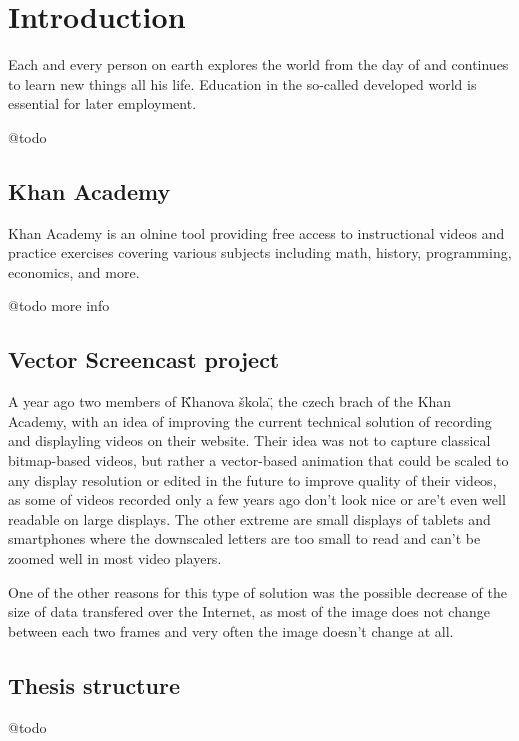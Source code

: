 \chapter*{Introduction}
Each and every person on earth explores the world from the day of and continues to learn new things all his life. Education in the so-called developed world is essential for later employment.

@todo 

\section{Khan Academy}
Khan Academy is an olnine tool providing free access to instructional videos and practice exercises covering various subjects including math, history, programming, economics, and more.

@todo more info

\section{Vector Screencast project}
A year ago two members of \"Khanova škola\", the czech brach of the Khan Academy, with an idea of improving the current technical solution of recording and displayling videos on their website. Their idea was not to capture classical bitmap-based videos, but rather a vector-based animation that could be scaled to any display resolution or edited in the future to improve quality of their videos, as some of videos recorded only a few years ago don't look nice or are't even well readable on large displays. The other extreme are small displays of tablets and smartphones where the downscaled letters are too small to read and can't be zoomed well in most video players.

One of the other reasons for this type of solution was the possible decrease of the size of data transfered over the Internet, as most of the image does not change between each two frames and very often the image doesn't change at all.

\section{Thesis structure}
@todo